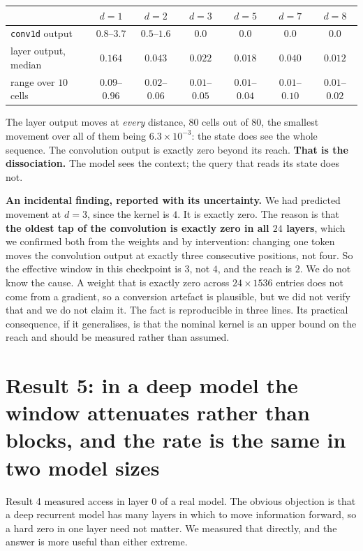 \documentclass[10pt]{article}
\begin{document}
\begin{center}
\begin{tabular}{lcccccc}
\toprule
& $d{=}1$ & $d{=}2$ & $d{=}3$ & $d{=}5$ & $d{=}7$ & $d{=}8$ \\
\midrule
\texttt{conv1d} output & $0.8$--$3.7$ & $0.5$--$1.6$ & $\mathbf{0.0}$ & $\mathbf{0.0}$ & $\mathbf{0.0}$ & $\mathbf{0.0}$ \\
layer output, median & $0.164$ & $0.043$ & $0.022$ & $0.018$ & $0.040$ & $0.012$ \\
\quad range over $10$ cells & $0.09$--$0.96$ & $0.02$--$0.06$ & $0.01$--$0.05$ & $0.01$--$0.04$ & $0.01$--$0.10$ & $0.01$--$0.02$ \\
\bottomrule
\end{tabular}
\end{center}

The layer output moves at \emph{every} distance, $80$ cells out of $80$, the smallest movement over
all of them being $6.3\!\times\!10^{-3}$: the state does see the whole sequence. The convolution output is exactly zero beyond its reach. \textbf{That is the dissociation.}
The model sees the context; the query that reads its state does not.

\textbf{An incidental finding, reported with its uncertainty.} We had predicted movement at $d=3$,
since the kernel is $4$. It is exactly zero. The reason is that \textbf{the oldest tap of the
convolution is exactly zero in all $24$ layers}, which we confirmed both from the weights and by
intervention: changing one token moves the convolution output at exactly three consecutive positions,
not four. So the effective window in this checkpoint is $3$, not $4$, and the reach is $2$. We do not
know the cause. A weight that is exactly zero across $24 \times 1536$ entries does not come from a
gradient, so a conversion artefact is plausible, but we did not verify that and we do not claim it.
The fact is reproducible in three lines. Its practical consequence, if it generalises, is that the
nominal kernel is an upper bound on the reach and should be measured rather than assumed.

\section{Result 5: in a deep model the window attenuates rather than blocks, and the rate is the same in two model sizes}

Result 4 measured access in layer $0$ of a real model. The obvious objection is that a deep recurrent
model has many layers in which to move information forward, so a hard zero in one layer need not
matter. We measured that directly, and the answer is more useful than either extreme.
\end{document}
